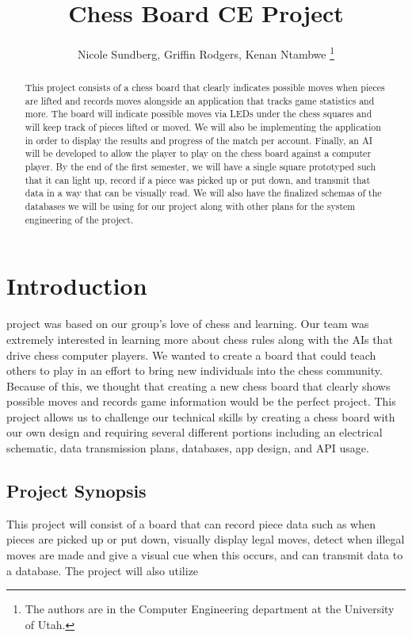 \documentclass[11pt,journal]{IEEEtran}
\begin{document}
\title{Chess Board CE Project}

\author{Nicole Sundberg, Griffin Rodgers, Kenan Ntambwe
  \thanks{The authors are in the Computer Engineering
    department at the University of Utah.}
}
\maketitle


\begin{abstract}
This project consists of a chess board that clearly indicates possible moves when pieces are lifted and records moves alongside an application that tracks game statistics and more. The board will indicate possible moves via LEDs under the chess squares and will keep track of pieces lifted or moved. We will also be implementing the application in order to display the results and progress of the match per account. Finally, an AI will be developed to allow the player to play on the chess board against a computer player. By the end of the first semester, we will have a single square prototyped such that it can light up, record if a piece was picked up or put down, and transmit that data in a way that can be visually read. We will also have the finalized schemas of the databases we will be using for our project along with other plans for the system engineering of the project.
\end{abstract}

\section{Introduction}

 project was based on our group's love of chess and learning. Our team was extremely interested in learning more about chess rules along with the AIs that drive chess computer players. We wanted to create a board that could teach others to play in an effort to bring new individuals into the chess community. Because of this, we thought that creating a new chess board that clearly shows possible moves and records game information would be the perfect project. This project allows us to challenge our technical skills by creating a chess board with our own design and requiring several different portions including an electrical schematic, data transmission plans, databases, app design, and API usage. 

\subsection{Project Synopsis}
This project will consist of a board that can record piece data such as when pieces are picked up or put down, visually display legal moves, detect when illegal moves are made and give a visual cue when this occurs, and can transmit data to a database. The project will also utilize 
\end{document}
